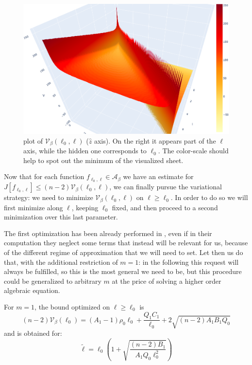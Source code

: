 \begin{figure}
	\includegraphics[scale=0.28]{Immagini/V-beta.png}
	\caption[]{plot of \(\mathcal{V}_{\beta}(\ell_0, \ell)\) (\(\hat{z}\) axis). On the right it appears part of the \(\ell\) axis, while the hidden one corresponds to \(\ell_0\). The color-scale should help to spot out the minimum of the visualized sheet.}
	\label{fig:V-beta}
\end{figure}

Now that for each function \(f_{\ell_0, \ell} \in \mathcal{A}_{\beta}\) we have an estimate for \(J\left[f_{\ell_0, \ell}\right] \le (n-2)\mathcal{V}_{\beta}(\ell_0, \ell)\), we can finally pursue the variational strategy: we need to minimize \(\mathcal{V}_{\beta}(\ell_0, \ell)\) on \(\ell \ge \ell_0\). In order to do so we will first minimize along \(\ell\), keeping \(\ell_0\) fixed, and then proceed to a second minimization over this last parameter.

The first optimization has been already performed in \cite{fewster2020new}, even if in their computation they neglect some terms that instead will be relevant for us, because of the different regime of approximation that we will need to set. Let then us do that, with the additional restriction of \(m = 1\): in the following this request will always be fulfilled, so this is the most general we need to be, but this procedure could be generalized to arbitrary \(m\) at the price of solving a higher order algebraic equation.

\begin{prop}
    For \(m = 1\), the bound optimized on \(\ell \ge \ell_0\) is
    \[
      (n-2)\mathcal{V}_{\beta}(\ell_0) = (A_1 - 1)\rho_0\ell_0 + \frac{Q_1C_1}{\ell_0} + 2 \sqrt{(n - 2)A_1B_1Q_0}   
    \]
    and is obtained for:
    \[
    \tilde{\ell} = \ell_0\left(1 + \sqrt{\frac{(n - 2) B_1}{A_1 Q_0\ell_0^2}}\right)    
    \]
\end{prop}

